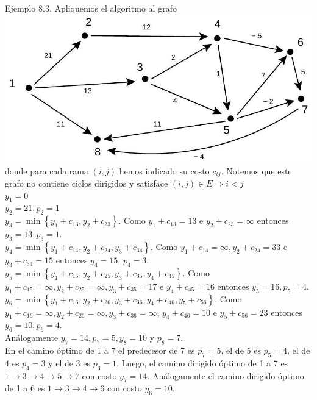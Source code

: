 \documentclass[10pt]{article}
\begin{document}
Ejemplo 8.3. Apliquemos el algoritmo al grafo\\
\includegraphics[max width=\textwidth, center]{2025_09_05_93c7c1835f249f70c0eeg-28}\\
donde para cada rama $(i, j)$ hemos indicado su costo $c_{i j}$. Notemos que este grafo no contiene ciclos dirigidos y satisface $(i, j) \in E \Longrightarrow i<j$\\
$y_{1}=0$\\
$y_{2}=21, p_{2}=1$\\
$y_{3}=\min \left\{y_{1}+c_{13}, y_{2}+c_{23}\right\}$. Como $y_{1}+c_{13}=13$ e $y_{2}+c_{23}=\infty$ entonces $y_{3}=13, p_{3}=1$.\\
$y_{4}=\min \left\{y_{1}+c_{14}, y_{2}+c_{24}, y_{3}+c_{34}\right\}$. Como $y_{1}+c_{14}=\infty, y_{2}+c_{24}=33$ e $y_{3}+c_{34}=15$ entonces $y_{4}=15$, $p_{4}=3$.\\
$y_{5}=\min \left\{y_{1}+c_{15}, y_{2}+c_{25}, y_{3}+c_{35}, y_{4}+c_{45}\right\}$. Como $y_{1}+c_{15}=\infty, y_{2}+c_{25}=\infty, y_{3}+c_{35}=17$ e $y_{4}+c_{45}=16$ entonces $y_{5}=16, p_{5}=4$.\\
$y_{6}=\min \left\{y_{1}+c_{16}, y_{2}+c_{26}, y_{3}+c_{36}, y_{4}+c_{46}, y_{5}+c_{56}\right\}$. Como $y_{1}+c_{16}=\infty, y_{2}+c_{26}=\infty, y_{3}+c_{36}=\infty$, $y_{4}+c_{46}=10$ e $y_{5}+c_{56}=23$ entonces $y_{6}=10, p_{6}=4$.\\
Análogamente $y_{7}=14, p_{7}=5, y_{8}=10$ y $p_{8}=7$.\\
En el camino óptimo de 1 a 7 el predecesor de 7 es $p_{7}=5$, el de 5 es $p_{5}=4$, el de 4 es $p_{4}=3$ y el de 3 es $p_{3}=1$. Luego, el camino dirigido óptimo de 1 a 7 es $1 \longrightarrow 3 \longrightarrow 4 \longrightarrow 5 \longrightarrow 7$ con costo $y_{7}=14$. Análogamente el camino dirigido óptimo de 1 a 6 es $1 \longrightarrow 3 \longrightarrow 4 \longrightarrow 6$ con costo $y_{6}=10$.
\end{document}
